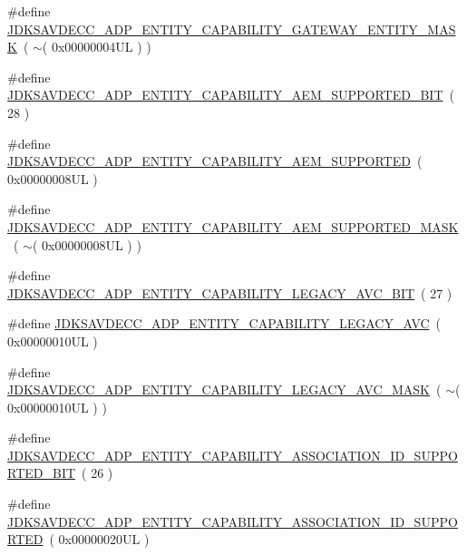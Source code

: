 \begin{DoxyCompactItemize}
\item 
\#define \hyperlink{group__adp__entity__capability_gae1ec0dde2cb5786281844d0087acfcae}{J\+D\+K\+S\+A\+V\+D\+E\+C\+C\+\_\+\+A\+D\+P\+\_\+\+E\+N\+T\+I\+T\+Y\+\_\+\+C\+A\+P\+A\+B\+I\+L\+I\+T\+Y\+\_\+\+G\+A\+T\+E\+W\+A\+Y\+\_\+\+E\+N\+T\+I\+T\+Y\+\_\+\+M\+A\+SK}~( $\sim$( 0x00000004\+U\+L ) )
\item 
\#define \hyperlink{group__adp__entity__capability_gae685f86a4bac573bc9e4c5e9ab401216}{J\+D\+K\+S\+A\+V\+D\+E\+C\+C\+\_\+\+A\+D\+P\+\_\+\+E\+N\+T\+I\+T\+Y\+\_\+\+C\+A\+P\+A\+B\+I\+L\+I\+T\+Y\+\_\+\+A\+E\+M\+\_\+\+S\+U\+P\+P\+O\+R\+T\+E\+D\+\_\+\+B\+IT}~( 28 )
\item 
\#define \hyperlink{group__adp__entity__capability_ga31ce86ded820c819c3a9a328e980a191}{J\+D\+K\+S\+A\+V\+D\+E\+C\+C\+\_\+\+A\+D\+P\+\_\+\+E\+N\+T\+I\+T\+Y\+\_\+\+C\+A\+P\+A\+B\+I\+L\+I\+T\+Y\+\_\+\+A\+E\+M\+\_\+\+S\+U\+P\+P\+O\+R\+T\+ED}~( 0x00000008\+U\+L )
\item 
\#define \hyperlink{group__adp__entity__capability_ga1f80443cb09165e6837f2b126341f9c5}{J\+D\+K\+S\+A\+V\+D\+E\+C\+C\+\_\+\+A\+D\+P\+\_\+\+E\+N\+T\+I\+T\+Y\+\_\+\+C\+A\+P\+A\+B\+I\+L\+I\+T\+Y\+\_\+\+A\+E\+M\+\_\+\+S\+U\+P\+P\+O\+R\+T\+E\+D\+\_\+\+M\+A\+SK}~( $\sim$( 0x00000008\+U\+L ) )
\item 
\#define \hyperlink{group__adp__entity__capability_ga2743b12827d2e1797b44c48ad7fe83e9}{J\+D\+K\+S\+A\+V\+D\+E\+C\+C\+\_\+\+A\+D\+P\+\_\+\+E\+N\+T\+I\+T\+Y\+\_\+\+C\+A\+P\+A\+B\+I\+L\+I\+T\+Y\+\_\+\+L\+E\+G\+A\+C\+Y\+\_\+\+A\+V\+C\+\_\+\+B\+IT}~( 27 )
\item 
\#define \hyperlink{group__adp__entity__capability_ga38ba5cdbd127a99415c51e20e11f545c}{J\+D\+K\+S\+A\+V\+D\+E\+C\+C\+\_\+\+A\+D\+P\+\_\+\+E\+N\+T\+I\+T\+Y\+\_\+\+C\+A\+P\+A\+B\+I\+L\+I\+T\+Y\+\_\+\+L\+E\+G\+A\+C\+Y\+\_\+\+A\+VC}~( 0x00000010\+U\+L )
\item 
\#define \hyperlink{group__adp__entity__capability_ga8db33e3f47f3ff827852028c167e78d0}{J\+D\+K\+S\+A\+V\+D\+E\+C\+C\+\_\+\+A\+D\+P\+\_\+\+E\+N\+T\+I\+T\+Y\+\_\+\+C\+A\+P\+A\+B\+I\+L\+I\+T\+Y\+\_\+\+L\+E\+G\+A\+C\+Y\+\_\+\+A\+V\+C\+\_\+\+M\+A\+SK}~( $\sim$( 0x00000010\+U\+L ) )
\item 
\#define \hyperlink{group__adp__entity__capability_ga5ac8d4d59d4946c1cd7b28e7373c98fd}{J\+D\+K\+S\+A\+V\+D\+E\+C\+C\+\_\+\+A\+D\+P\+\_\+\+E\+N\+T\+I\+T\+Y\+\_\+\+C\+A\+P\+A\+B\+I\+L\+I\+T\+Y\+\_\+\+A\+S\+S\+O\+C\+I\+A\+T\+I\+O\+N\+\_\+\+I\+D\+\_\+\+S\+U\+P\+P\+O\+R\+T\+E\+D\+\_\+\+B\+IT}~( 26 )
\item 
\#define \hyperlink{group__adp__entity__capability_gaecdebb8d33194f89f592ab2e4f8a2c79}{J\+D\+K\+S\+A\+V\+D\+E\+C\+C\+\_\+\+A\+D\+P\+\_\+\+E\+N\+T\+I\+T\+Y\+\_\+\+C\+A\+P\+A\+B\+I\+L\+I\+T\+Y\+\_\+\+A\+S\+S\+O\+C\+I\+A\+T\+I\+O\+N\+\_\+\+I\+D\+\_\+\+S\+U\+P\+P\+O\+R\+T\+ED}~( 0x00000020\+U\+L )

\end{DoxyCompactItemize}

